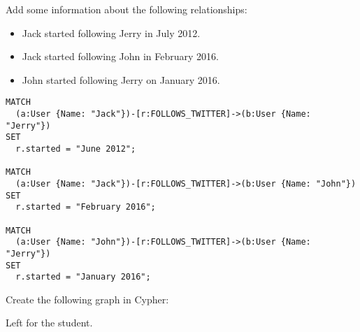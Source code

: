 \begin{questions}
\question
Add some information about the following relationships:
\begin{itemize}
  \item Jack started following Jerry in July 2012.
  \item Jack started following John in February 2016.
  \item John started following Jerry on January 2016.
\end{itemize}

\begin{solution}
  \begin{verbatim}
MATCH
  (a:User {Name: "Jack"})-[r:FOLLOWS_TWITTER]->(b:User {Name: "Jerry"})
SET
  r.started = "June 2012";
	
MATCH
  (a:User {Name: "Jack"})-[r:FOLLOWS_TWITTER]->(b:User {Name: "John"})
SET
  r.started = "February 2016";
	
MATCH
  (a:User {Name: "John"})-[r:FOLLOWS_TWITTER]->(b:User {Name: "Jerry"})
SET
  r.started = "January 2016";
  \end{verbatim}
\end{solution}

\question
  Create the following graph in Cypher:
  \begin{center}
  \end{center}
\begin{solution}
Left for the student.
\end{solution}




\end{questions}

%
